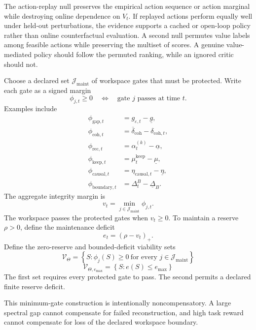 The action-replay null preserves the empirical action sequence or action
marginal while destroying online dependence on \(V_t\). If replayed actions
perform equally well under held-out perturbations, the evidence supports a
cached or open-loop policy rather than online counterfactual evaluation. A
second null permutes value labels among feasible actions while preserving the
multiset of scores. A genuine value-mediated policy should follow the
permuted ranking, while an ignored critic should not.


Choose a declared set \(\mathcal J_{\mathrm{maint}}\) of workspace gates that
must be protected. Write each gate as a signed margin
\[
\phi_{j,t}
\geq0
\quad\Longleftrightarrow\quad
\text{gate }j\text{ passes at time }t.
\]
Examples include
\[
\begin{aligned}
\phi_{\mathrm{gap},t}
&=g_{\varepsilon,t}-\underline g,\\
\phi_{\mathrm{coh},t}
&=\overline\delta_{\mathrm{coh}}-\delta_{\mathrm{coh},t},\\
\phi_{\mathrm{rec},t}
&=\alpha_t^{(k)}-\underline\alpha,\\
\phi_{\mathrm{keep},t}
&=\mu_t^{\mathrm{keep}}-\underline\mu,\\
\phi_{\mathrm{causal},t}
&=\eta_{\mathrm{causal},t}-\underline\eta,\\
\phi_{\mathrm{boundary},t}
&=\Delta_t^B-\underline\Delta_B.
\end{aligned}
\]
The aggregate integrity margin is
\[
\boxed{
v_t
=
\min_{j\in\mathcal J_{\mathrm{maint}}}\phi_{j,t}.
}
\]
The workspace passes the protected gates when \(v_t\geq0\). To maintain a
reserve \(\rho>0\), define the maintenance deficit
\[
\boxed{
e_t
=(\rho-v_t)_+.
}
\]
Define the zero-reserve and bounded-deficit viability sets
\[
\boxed{
\mathcal V_\Theta
=
\left\{
S:\phi_j(S)\geq0\ \text{for every }j\in\mathcal J_{\mathrm{maint}}
\right\}
}
\]
\[
\boxed{
\mathcal V_{\Theta,e_{\max}}
=
\left\{
S:e(S)\leq e_{\max}
\right\}
}
\]
The first set requires every protected gate to pass. The second permits a
declared finite reserve deficit.

This minimum-gate construction is intentionally noncompensatory. A large
spectral gap cannot compensate for failed reconstruction, and high task reward
cannot compensate for loss of the declared workspace boundary.


